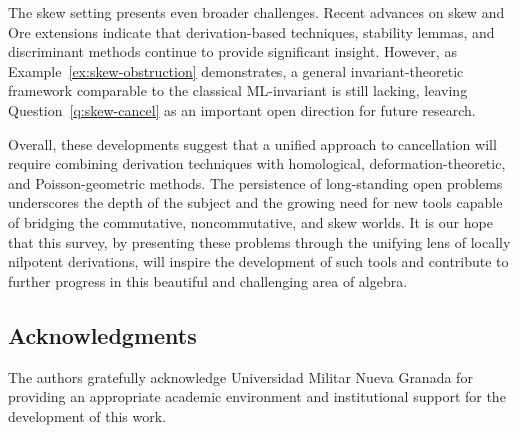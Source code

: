 \documentclass{amsart}
\theoremstyle{plain}
\numberwithin{theorem}{section}
\numberwithin{equation}{theorem}
\theoremstyle{definition}
\begin{document}
The skew setting presents even broader challenges. Recent advances on skew and Ore extensions \cite{TZZ, LuWZ} indicate that derivation-based techniques, stability lemmas, and discriminant methods continue to provide significant insight. However, as Example~\ref{ex:skew-obstruction} demonstrates, a general invariant-theoretic framework comparable to the classical ML-invariant is still lacking, leaving Question~\ref{q:skew-cancel} as an important open direction for future research.

Overall, these developments suggest that a unified approach to cancellation will require combining derivation techniques with homological, deformation-theoretic, and Poisson-geometric methods. The persistence of long-standing open problems underscores the depth of the subject and the growing need for new tools capable of bridging the commutative, noncommutative, and skew worlds. It is our hope that this survey, by presenting these problems through the unifying lens of locally nilpotent derivations, will inspire the development of such tools and contribute to further progress in this beautiful and challenging area of algebra.
















\subsection*{Acknowledgments}The authors gratefully acknowledge Universidad Militar Nueva Granada for providing an appropriate academic environment and institutional support for the development of this work.




\end{document}
